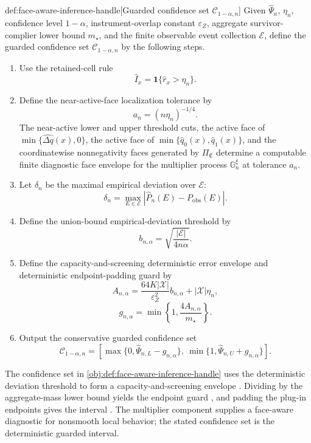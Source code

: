\documentclass[11pt]{article}
\begin{document}
\begin{algorithmv}{def:face-aware-inference-handle}[Guarded confidence set \(\mathcal C_{1-\alpha,n}\)]
Given \(\widehat\Psi_n\), \(\eta_n\), confidence level \(1-\alpha\), instrument-overlap constant \(\varepsilon_Z\), aggregate survivor-complier lower bound \(m_{\star}\), and the finite observable event collection \(\mathcal E\), define the guarded confidence set \(\mathcal C_{1-\alpha,n}\) by the following steps.
\begin{enumerate}
\item Use the retained-cell rule
\[
\widehat I_x=\mathbf 1\{\widehat r_x>\eta_n\}.
\]

\item Define the near-active-face localization tolerance by
\[
a_n=(n\eta_n)^{-1/4}.
\]
The near-active lower and upper threshold cuts, the active face of \(\min\{\widehat{\Delta q}(x),0\}\), the active face of \(\min\{\widehat q_0(x),\widehat q_1(x)\}\), and the coordinatewise nonnegativity faces generated by \(\Pi_{\mathfrak C}\) determine a computable finite diagnostic face envelope for the multiplier process \(\mathbb G_n^\xi\) at tolerance \(a_n\).

\item Let \(\delta_n\) be the maximal empirical deviation over \(\mathcal E\):
\[
\delta_n=\max_{E\in\mathcal E}\left|\widehat P_n(E)-P_{\mathrm{obs}}(E)\right|.
\]

\item Define the union-bound empirical-deviation threshold by
\[
b_{n,\alpha}=\sqrt{\frac{|\mathcal E|}{4n\alpha}}.
\]

\item Define the capacity-and-screening deterministic error envelope and deterministic endpoint-padding guard by
\[
A_{n,\alpha}
=
\frac{64K|\mathcal X|}{\varepsilon_Z^2}b_{n,\alpha}
+
|\mathcal X|\eta_n,
\]
\[
g_{n,\alpha}
=
\min\left\{1,\frac{4A_{n,\alpha}}{m_{\star}}\right\}.
\]

\item Output the conservative guarded confidence set
\[
\mathcal C_{1-\alpha,n}
=
\left[
\max\{0,\widehat\Psi_{n,L}-g_{n,\alpha}\},\
\min\{1,\widehat\Psi_{n,U}+g_{n,\alpha}\}
\right].
\]
\end{enumerate}
\end{algorithmv}

The confidence set in \cref{obj:def:face-aware-inference-handle} uses the deterministic deviation threshold  to form a capacity-and-screening envelope .  Dividing by the aggregate-mass lower bound yields the endpoint guard , and padding the plug-in endpoints gives the interval .  The multiplier component supplies a face-aware diagnostic for nonsmooth local behavior; the stated confidence set is the deterministic guarded interval.
\end{document}
